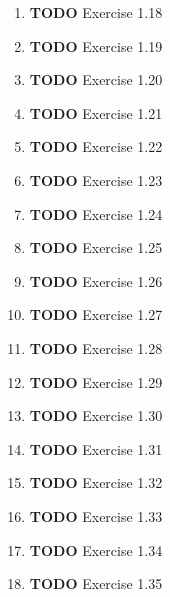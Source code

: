 \documentclass[11pt]{article}
\begin{document}
\begin{enumerate}
\begin{enumerate}
\item {\bfseries\sffamily TODO} Exercise 1.18
\label{sec:org5a33aff}

\item {\bfseries\sffamily TODO} Exercise 1.19
\label{sec:orgac62a03}

\item {\bfseries\sffamily TODO} Exercise 1.20
\label{sec:org49fd678}

\item {\bfseries\sffamily TODO} Exercise 1.21
\label{sec:org0c015aa}

\item {\bfseries\sffamily TODO} Exercise 1.22
\label{sec:org69f04f0}

\item {\bfseries\sffamily TODO} Exercise 1.23
\label{sec:orgfd79739}

\item {\bfseries\sffamily TODO} Exercise 1.24
\label{sec:org4a39496}

\item {\bfseries\sffamily TODO} Exercise 1.25
\label{sec:org2f203fc}

\item {\bfseries\sffamily TODO} Exercise 1.26
\label{sec:orgbb72424}

\item {\bfseries\sffamily TODO} Exercise 1.27
\label{sec:orgdc7e304}

\item {\bfseries\sffamily TODO} Exercise 1.28
\label{sec:org90a13a5}

\item {\bfseries\sffamily TODO} Exercise 1.29
\label{sec:orge8d5f08}

\item {\bfseries\sffamily TODO} Exercise 1.30
\label{sec:orgb747bcf}

\item {\bfseries\sffamily TODO} Exercise 1.31
\label{sec:org1956e63}

\item {\bfseries\sffamily TODO} Exercise 1.32
\label{sec:orgc419980}

\item {\bfseries\sffamily TODO} Exercise 1.33
\label{sec:orgfbaba51}

\item {\bfseries\sffamily TODO} Exercise 1.34
\label{sec:org4cbb581}

\item {\bfseries\sffamily TODO} Exercise 1.35
\label{sec:orgfab5ed7}


\end{enumerate}
\end{enumerate}
\end{document}
